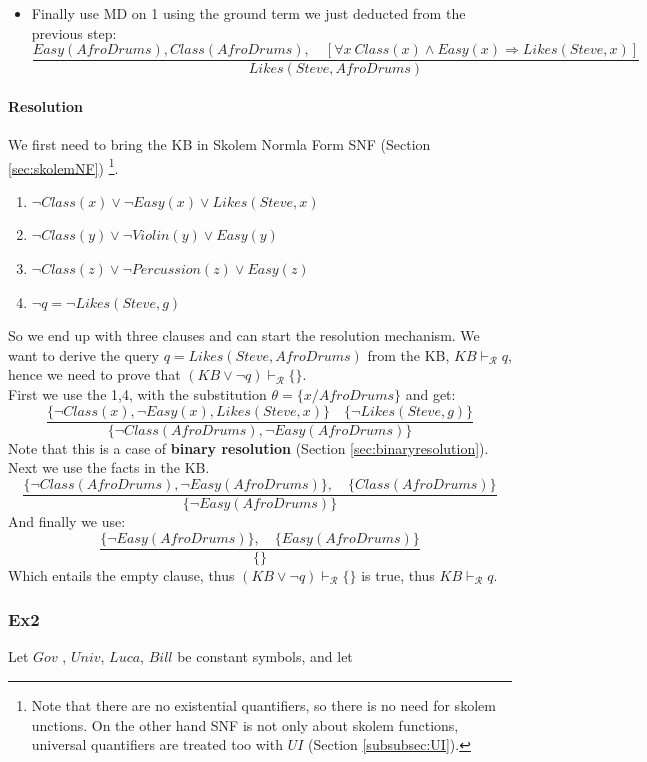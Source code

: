 \documentclass[10pt,a4paper]{article}
\begin{document}
\begin{itemize}
\begin{itemize}
\item Finally use MD on 1 using the ground term we just deducted from the previous step:
\[\frac{Easy(AfroDrums),Class(AfroDrums),\quad [\forall x\ Class(x)\wedge Easy(x) \Rightarrow Likes(Steve,x)]}{Likes(Steve,AfroDrums)}\]
\end{itemize}


\paragraph{Resolution}
We first need to bring the KB in  Skolem Normla Form SNF (Section \ref{sec:skolemNF}) \footnote{Note that there are no existential quantifiers, so there is no need for skolem unctions. On the other hand SNF is not only about skolem functions, universal quantifiers are treated too with $UI$ (Section \ref{subsubsec:UI}). }.

\begin{enumerate}
\item $\neg Class(x) \vee \neg Easy(x) \vee Likes(Steve,x)$
\item $\neg Class(y) \vee \neg Violin(y) \vee Easy(y)$
\item $\neg Class(z) \vee \neg Percussion(z) \vee Easy(z)$
\item $\neg q=\neg Likes(Steve,g)$
\end{enumerate}

So we end up with three clauses and can start the resolution mechanism. We want to derive the query $q=Likes(Steve,AfroDrums)$ from the KB, $KB\vdash_{\mathcal{R}}q$, hence we need to prove that $(KB \vee \neg q) \vdash_{\mathcal{R}} \{\}$.\\
First we use the 1,4, with the substitution $\theta=\lbrace x/AfroDrums\rbrace$ and get:
\[\frac{\lbrace \neg Class(x), \neg Easy(x), Likes(Steve,x)\rbrace\quad \lbrace \neg Likes(Steve,g)\rbrace}{\lbrace \neg Class(AfroDrums), \neg Easy(AfroDrums) \rbrace}\]
Note that this is a case of \textbf{binary resolution} (Section \ref{sec:binaryresolution}). Next we use the facts in the KB.
\[\frac{\lbrace \neg Class(AfroDrums),\neg Easy(AfroDrums) \rbrace,\quad \lbrace Class(AfroDrums) \rbrace}{\lbrace \neg Easy(AfroDrums) \rbrace}\]
And finally we use:
\[\frac{\lbrace \neg Easy(AfroDrums) \rbrace,\quad \lbrace Easy(AfroDrums) \rbrace}{\lbrace \rbrace}\]
Which entails the empty clause, thus $(KB \vee \neg q) \vdash_{\mathcal{R}} \{\}$ is true, thus $KB\vdash_{\mathcal{R}}q$.

\subsubsection{Ex2}
Let $Gov$ , $Univ$, $Luca$, $Bill$ be constant symbols, and let


\end{itemize}
\end{document}
